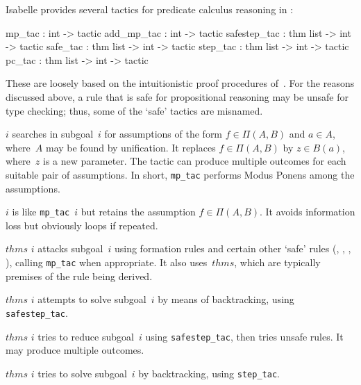 Isabelle provides several tactics for predicate calculus reasoning in \CTT:
\begin{ttbox}
mp_tac       : int -> tactic
add_mp_tac   : int -> tactic
safestep_tac : thm list -> int -> tactic
safe_tac     : thm list -> int -> tactic
step_tac     : thm list -> int -> tactic
pc_tac       : thm list -> int -> tactic
\end{ttbox}
These are loosely based on the intuitionistic proof procedures
of~.  For the reasons discussed above, a rule that is safe for
propositional reasoning may be unsafe for type checking; thus, some of the
`safe' tactics are misnamed.
\begin{ttdescription}
\item[\ttindexbold{mp_tac} $i$] 
searches in subgoal~$i$ for assumptions of the form $f\in\Pi(A,B)$ and
$a\in A$, where~$A$ may be found by unification.  It replaces
$f\in\Pi(A,B)$ by $z\in B(a)$, where~$z$ is a new parameter.  The tactic
can produce multiple outcomes for each suitable pair of assumptions.  In
short, {\tt mp_tac} performs Modus Ponens among the assumptions.

\item[\ttindexbold{add_mp_tac} $i$]
is like {\tt mp_tac}~$i$ but retains the assumption $f\in\Pi(A,B)$.  It
avoids information loss but obviously loops if repeated.

\item[\ttindexbold{safestep_tac} $thms$ $i$]
attacks subgoal~$i$ using formation rules and certain other `safe' rules
(, , , ), calling
{\tt mp_tac} when appropriate.  It also uses~$thms$,
which are typically premises of the rule being derived.

\item[\ttindexbold{safe_tac} $thms$ $i$] attempts to solve subgoal~$i$ by
  means of backtracking, using {\tt safestep_tac}.

\item[\ttindexbold{step_tac} $thms$ $i$]
tries to reduce subgoal~$i$ using {\tt safestep_tac}, then tries unsafe
rules.  It may produce multiple outcomes.

\item[\ttindexbold{pc_tac} $thms$ $i$]
tries to solve subgoal~$i$ by backtracking, using {\tt step_tac}.
\end{ttdescription}



